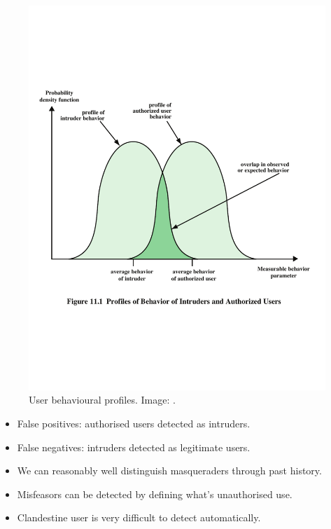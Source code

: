 \begin{frame}
  \begin{figure}
    \includegraphics[height=0.7\textheight]{figs/profiles.pdf}
    \caption{User behavioural profiles.
      Image: \cite{Stallings2013nse}.}
  \end{figure}
\end{frame}

\begin{frame}
  \begin{itemize}
    \item False positives: authorised users detected as intruders.

    \item False negatives: intruders detected as legitimate users.

    \item We can reasonably well distinguish masqueraders through past history.

    \item Misfeasors can be detected by defining what's unauthorised use.

    \item Clandestine user is very difficult to detect automatically.

  \end{itemize}
\end{frame}

